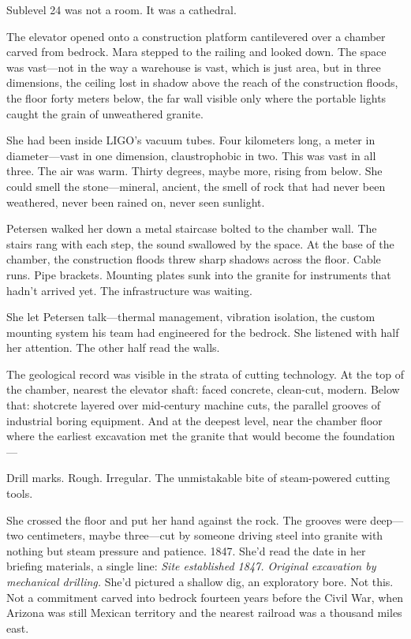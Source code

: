 \scenebreak

Sublevel 24 was not a room. It was a cathedral.

The elevator opened onto a construction platform cantilevered over a chamber carved from bedrock. Mara stepped to the railing and looked down. The space was vast---not in the way a warehouse is vast, which is just area, but in three dimensions, the ceiling lost in shadow above the reach of the construction floods, the floor forty meters below, the far wall visible only where the portable lights caught the grain of unweathered granite.

She had been inside LIGO's vacuum tubes. Four kilometers long, a meter in diameter---vast in one dimension, claustrophobic in two. This was vast in all three. The air was warm. Thirty degrees, maybe more, rising from below. She could smell the stone---mineral, ancient, the smell of rock that had never been weathered, never been rained on, never seen sunlight.

Petersen walked her down a metal staircase bolted to the chamber wall. The stairs rang with each step, the sound swallowed by the space. At the base of the chamber, the construction floods threw sharp shadows across the floor. Cable runs. Pipe brackets. Mounting plates sunk into the granite for instruments that hadn't arrived yet. The infrastructure was waiting.

She let Petersen talk---thermal management, vibration isolation, the custom mounting system his team had engineered for the bedrock. She listened with half her attention. The other half read the walls.

The geological record was visible in the strata of cutting technology. At the top of the chamber, nearest the elevator shaft: faced concrete, clean-cut, modern. Below that: shotcrete layered over mid-century machine cuts, the parallel grooves of industrial boring equipment. And at the deepest level, near the chamber floor where the earliest excavation met the granite that would become the foundation---

Drill marks. Rough. Irregular. The unmistakable bite of steam-powered cutting tools.

She crossed the floor and put her hand against the rock. The grooves were deep---two centimeters, maybe three---cut by someone driving steel into granite with nothing but steam pressure and patience. 1847. She'd read the date in her briefing materials, a single line: \textit{Site established 1847. Original excavation by mechanical drilling.} She'd pictured a shallow dig, an exploratory bore. Not this. Not a commitment carved into bedrock fourteen years before the Civil War, when Arizona was still Mexican territory and the nearest railroad was a thousand miles east.

